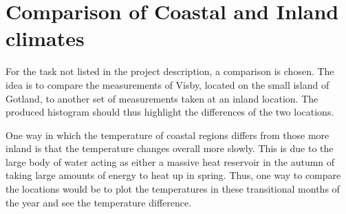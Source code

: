 \section{Comparison of Coastal and Inland climates}
For the task not listed in the project description, a comparison is chosen. The idea is to compare the measurements of Visby, located on the small island of Gotland, to another set of measurements taken at an inland location. The produced histogram should thus highlight the differences of the two locations.

One way in which the temperature of coastal regions differs from those more inland is that the temperature changes overall more slowly. This is due to the large body of water acting as either a massive heat reservoir in the autumn of taking large amounts of energy to heat up in spring. Thus, one way to compare the locations would be to plot the temperatures in these transitional months of the year and see the temperature difference.
